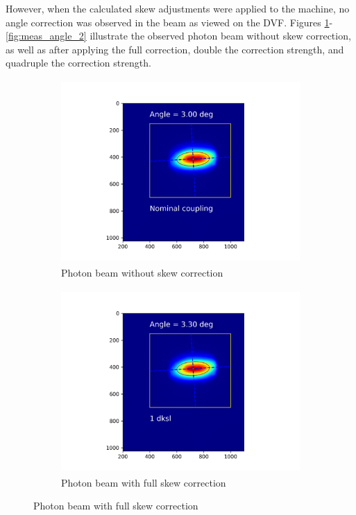 \documentclass[a4paper,12pt]{article}
\begin{document}
However, when the calculated skew adjustments
 were applied to the machine, no angle correction
  was observed in the beam as viewed on the DVF. Figures
   \ref{fig:meas_angle_1}-\ref{fig:meas_angle_2} illustrate the observed photon beam without skew correction,
    as well as after applying the full correction, double the correction
     strength, and quadruple the correction strength.

\begin{figure}[H]
\centering
\begin{subfigure}{0.4\textwidth}
\includegraphics[width=1\linewidth, height=7cm]{Nominal_coupling_angle.png} 
\caption{Photon beam without skew correction}
\end{subfigure}
\begin{subfigure}{0.4\textwidth}
\includegraphics[width=1\linewidth, height=7cm]{1dksl_coupling_angle.png}
\caption{Photon beam with full skew correction}
\end{subfigure}
\label{fig:meas_angle_1}
\end{figure}
\end{document}
